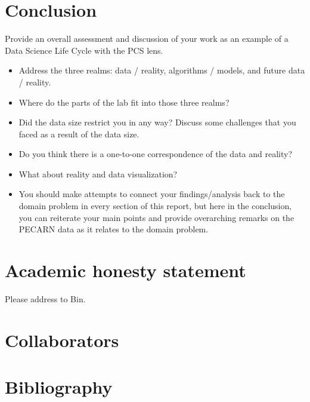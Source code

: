 \documentclass[10pt,letterpaper]{article}
\begin{document}
\section{Conclusion}\label{conclusion}
Provide an overall assessment and discussion of your work as an example of a Data Science Life Cycle with the PCS lens.
\begin{itemize}
\item Address the three realms: data / reality, algorithms / models, and future data / reality.
\item Where do the parts of the lab fit into those three realms?
\item Did the data size restrict you in any way? Discuss some challenges that you faced as a result of the data size.
\item Do you think there is a one-to-one correspondence of the data and reality?
\item What about reality and data visualization?
\item You should make attempts to connect your findings/analysis back to the domain problem in every section of this report, but here in the conclusion, you can reiterate your main points and provide overarching remarks on the PECARN data as it relates to the domain problem.
\end{itemize}

\section{Academic honesty statement}\label{academic-honesty-statement}

Please address to Bin.

\section{Collaborators}\label{collaborators}

\section{Bibliography}\label{bibliography}
\end{document}
